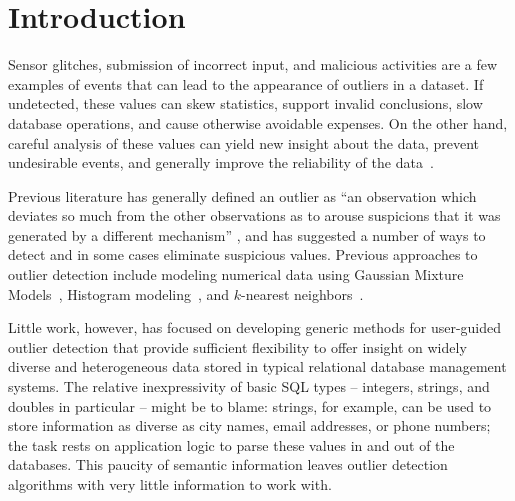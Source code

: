 \section{Introduction}
\label{sec:intro}

Sensor glitches, submission of incorrect input, and malicious activities are a few examples of events that can lead to the appearance of outliers in a dataset. If undetected, these values can skew statistics, support invalid conclusions, slow database operations, and cause otherwise avoidable expenses. On the other hand, careful analysis of these values can yield new insight about the data, prevent undesirable events, and generally improve the reliability of the data~\cite{Achour2014}.

Previous literature has generally defined an outlier as ``an observation which deviates so much from the other observations as to arouse suspicions that it was generated by a different mechanism'' \cite{Hawkins1980}, and has suggested a number of ways to detect and in some cases eliminate suspicious values. Previous approaches to outlier detection include modeling numerical data using Gaussian Mixture Models~\cite{Lu2005,Roberts1994,Roberts1999}, Histogram modeling~\cite{Gebski2007,Sheng2007}, and $k$-nearest neighbors~\cite{Ramaswamy2000}.

Little work, however, has focused on developing generic methods for user-guided outlier detection that provide sufficient flexibility to offer insight on widely diverse and heterogeneous data stored in typical relational database management systems. The relative inexpressivity of basic SQL types -- integers, strings, and doubles in particular -- might be to blame: strings, for example, can be used to store information as diverse as city names, email addresses, or phone numbers; the task rests on application logic to parse these values in and out of the databases. This paucity of semantic information leaves outlier detection algorithms with very little information to work with.

